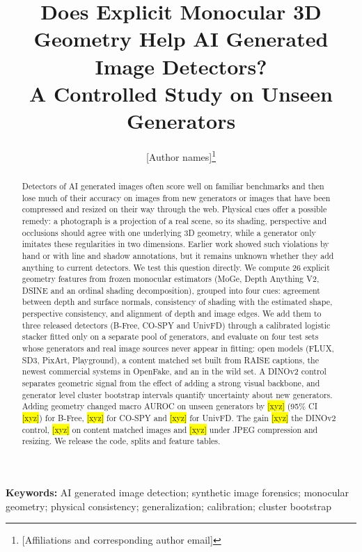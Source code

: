 \documentclass[11pt,a4paper]{article}
\title{Does Explicit Monocular 3D Geometry Help AI Generated Image Detectors?\\ A Controlled Study on Unseen Generators}
\author{[Author names]\thanks{[Affiliations and corresponding author email]}}
\date{}
\newcommand{\xyz}[1][]{\colorbox{yellow}{[xyz]}}
\begin{document}
\maketitle

\begin{abstract}
Detectors of AI generated images often score well on familiar benchmarks and then lose much of their accuracy on images from new generators or images that have been compressed and resized on their way through the web. Physical cues offer a possible remedy: a photograph is a projection of a real scene, so its shading, perspective and occlusions should agree with one underlying 3D geometry, while a generator only imitates these regularities in two dimensions. Earlier work showed such violations by hand or with line and shadow annotations, but it remains unknown whether they add anything to current detectors. We test this question directly. We compute 26 explicit geometry features from frozen monocular estimators (MoGe, Depth Anything V2, DSINE and an ordinal shading decomposition), grouped into four cues: agreement between depth and surface normals, consistency of shading with the estimated shape, perspective consistency, and alignment of depth and image edges. We add them to three released detectors (B-Free, CO-SPY and UnivFD) through a calibrated logistic stacker fitted only on a separate pool of generators, and evaluate on four test sets whose generators and real image sources never appear in fitting: open models (FLUX, SD3, PixArt, Playground), a content matched set built from RAISE captions, the newest commercial systems in OpenFake, and an in the wild set. A DINOv2 control separates geometric signal from the effect of adding a strong visual backbone, and generator level cluster bootstrap intervals quantify uncertainty about new generators. Adding geometry changed macro AUROC on unseen generators by \xyz[h1.bfree.delta]{} (95\% CI \xyz[h1.bfree.ci]) for B-Free, \xyz[h1.cospy.delta]{} for CO-SPY and \xyz[h1.univfd.delta]{} for UnivFD. The gain \xyz[h2.abstract_verb]{} the DINOv2 control, \xyz[h3.abstract_verb]{} on content matched images and \xyz[h4.abstract_verb]{} under JPEG compression and resizing. We release the code, splits and feature tables.
\end{abstract}

\noindent\textbf{Keywords:} AI generated image detection; synthetic image forensics; monocular geometry; physical consistency; generalization; calibration; cluster bootstrap

\end{document}

